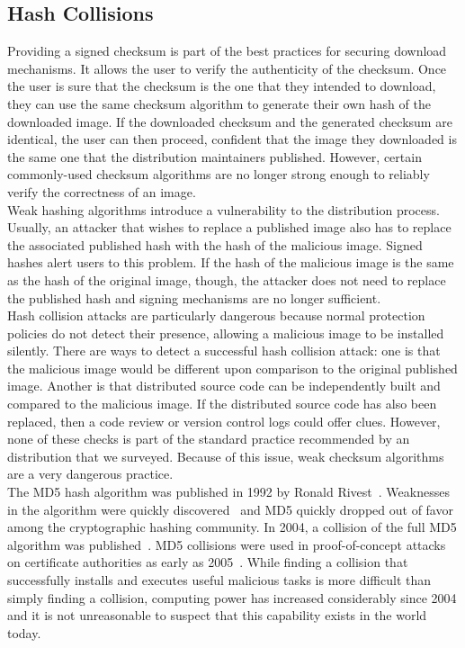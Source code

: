 \documentclass[conference]{IEEEtran}
\begin{document}
\subsection{Hash Collisions}
Providing a signed checksum is part of the best practices for securing download mechanisms. It allows the user to verify the authenticity of the checksum. Once the user is sure that the checksum is the one that they intended to download, they can use the same checksum algorithm to generate their own hash of the downloaded image. If the downloaded checksum and the generated checksum are identical, the user can then proceed, confident that the image they downloaded is the same one that the distribution maintainers published. However, certain commonly-used checksum algorithms are no longer strong enough to reliably verify the correctness of an image.\\
\indent Weak hashing algorithms introduce a vulnerability to the distribution process. Usually, an attacker that wishes to replace a published image also has to replace the associated published hash with the hash of the malicious image. Signed hashes alert users to this problem. If the hash of the malicious image is the same as the hash of the original image, though, the attacker does not need to replace the published hash and signing mechanisms are no longer sufficient.\\
\indent Hash collision attacks are particularly dangerous because normal protection policies do not detect their presence, allowing a malicious image to be installed silently. There are ways to detect a successful hash collision attack: one is that the malicious image would be different upon comparison to the original published image. Another is that distributed source code can be independently built and compared to the malicious image. If the distributed source code has also been replaced, then a code review or version control logs could offer clues. However, none of these checks is part of the standard practice recommended by an distribution that we surveyed. Because of this issue, weak checksum algorithms are a very dangerous practice.\\
\indent The MD5 hash algorithm was published in 1992 by Ronald Rivest~\cite{rivest1992md5}. Weaknesses in the algorithm were quickly discovered~\cite{md51993} and MD5 quickly dropped out of favor among the cryptographic hashing community. In 2004, a collision of the full MD5 algorithm was published~\cite{wang2004collisions}. MD5 collisions were used in proof-of-concept attacks on certificate authorities as early as 2005~\cite{md5attack}. While finding a collision that successfully installs and executes useful malicious tasks is more difficult than simply finding a collision, computing power has increased considerably since 2004 and it is not unreasonable to suspect that this capability exists in the world today.\\
\end{document}
